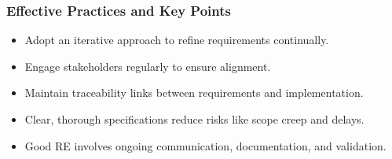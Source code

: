 \documentclass{beamer}
\begin{document}
\begin{frame}[fragile]
  \frametitle{Effective Practices and Key Points}
  \begin{itemize}
    \item Adopt an iterative approach to refine requirements continually.
    \item Engage stakeholders regularly to ensure alignment.
    \item Maintain traceability links between requirements and implementation.
    \item Clear, thorough specifications reduce risks like scope creep and delays.
    \item Good RE involves ongoing communication, documentation, and validation.
  \end{itemize}
\end{frame}
\end{document}

